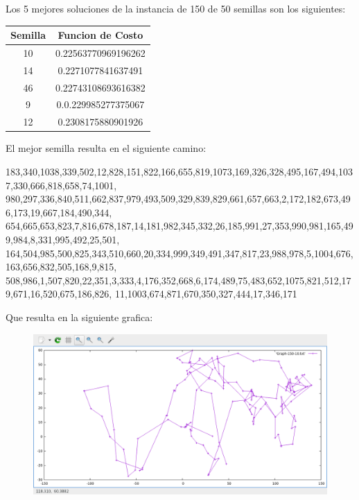 \documentclass{article}
\begin{document}
    Los 5 mejores soluciones de la instancia de 150 de 50 semillas son los siguientes:
        \begin{center}
        \begin{tabular}{ |c | c |} 
             \hline
             Semilla & Funcion de Costo \\
             \hline
             10 & 0.22563770969196262 \\ 
             14 & 0.2271077841637491 \\ 
             46 & 0.22743108693616382\\ 
             9 & 0.0.229985277375067\\ 
             12 & 0.2308175880901926\\  
             \hline
        \end{tabular}
    \end{center}
    El mejor semilla resulta en el siguiente camino:
    \begin{center}
    183,340,1038,339,502,12,828,151,822,166,655,819,1073,169,326,328,495,167,494,1037,330,666,818,658,74,1001,
    980,297,336,840,511,662,837,979,493,509,329,839,829,661,657,663,2,172,182,673,496,173,19,667,184,490,344,
    654,665,653,823,7,816,678,187,14,181,982,345,332,26,185,991,27,353,990,981,165,499,984,8,331,995,492,25,501,
    164,504,985,500,825,343,510,660,20,334,999,349,491,347,817,23,988,978,5,1004,676,163,656,832,505,168,9,815,
    508,986,1,507,820,22,351,3,333,4,176,352,668,6,174,489,75,483,652,1075,821,512,179,671,16,520,675,186,826,
    11,1003,674,871,670,350,327,444,17,346,171
    \end{center}
    Que resulta en la siguiente grafica:
    \begin{figure}[h]
        \centering
        \includegraphics[width=\textwidth,height=\textheight,keepaspectratio]{Graph150.png}
    \end{figure} \\
\end{document}
